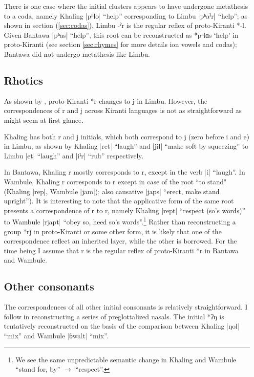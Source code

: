 \documentclass[oldfontcommands,oneside,a4paper,11pt]{article}
\newcommand{\ipa}[1]{{\phon\mbox{#1}}} %
\newcommand{\dhatu}[2]{|\ipa{#1}| ``#2''}
\begin{document}
There is one case where the initial clusters appears to have undergone metathesis to a coda, namely Khaling \dhatu{pʰlo}{help} corresponding to Limbu \dhatu{pʰaˀr}{help}; as shown in section (\ref{sec:codas}), Limbu \ipa{-ˀr} is the regular reflex of proto-Kiranti *\ipa{-l}. Given Bantawa \dhatu{pʰas}{help}, this root can be reconstructed as *\ipa{pʰlɑs} `help' in proto-Kiranti (see section \ref{sec:rhymes} for more details ion vowels and codas); Bantawa did not undergo metathesis like Limbu.
 
\subsection{Rhotics} 
As shown by  \citet{driem90r}, proto-Kiranti *\ipa{r} changes to \ipa{j} in Limbu. However, the correspondences of \ipa{r} and \ipa{j} across Kiranti languages is not as straightforward as might seem at first glance.

Khaling has both \ipa{r} and \ipa{j} initials, which both correspond to \ipa{j} (zero before \ipa{i} and \ipa{e}) in Limbu, as shown by Khaling \dhatu{ret}{laugh} and  \dhatu{jil}{make soft by squeezing} to Limbu \dhatu{et}{laugh} and \dhatu{iˀr}{rub} respectively.

In Bantawa, Khaling \ipa{r} mostly corresponds to \ipa{r}, except in the verb \dhatu{i}{laugh}. In Wambule, Khaling \ipa{r} corresponds to \ipa{r} except in case of the root ``to stand" (Khaling |\ipa{rep}|, Wambule  |\ipa{jam}|); also causative \dhatu{japs}{erect, make stand upright}). It is interesting to note that the applicative form of the same root presents a correspondence of \ipa{r} to \ipa{r}, namely Khaling \dhatu{rept}{respect (so's words)} to Wambule \dhatu{rjapt}{obey so, heed so's words}.\footnote{We see the same unpredictable semantic change in Khaling and Wambule ``stand for, by'' $\rightarrow$ ``respect''.} Rather than reconstructing a group *\ipa{rj} in proto-Kiranti or some other form, it is likely that one of the correspondence reflect an inherited layer, while the other is borrowed. For the time being I assume that \ipa{r} is the regular reflex of proto-Kiranti *\ipa{r} in Bantawa and Wambule.


 

\subsection{Other consonants}
The correspondences of all other initial consonants is relatively straightforward. I follow \citet{opgenort04implosives} in reconstructing a series of preglottalized nasals. The initial \ipa{*ʔŋ} is tentatively reconstructed on the basis of the comparison between Khaling \dhatu{ŋol}{mix} and Wambule \dhatu{ɓwalt}{mix}.
\end{document}
